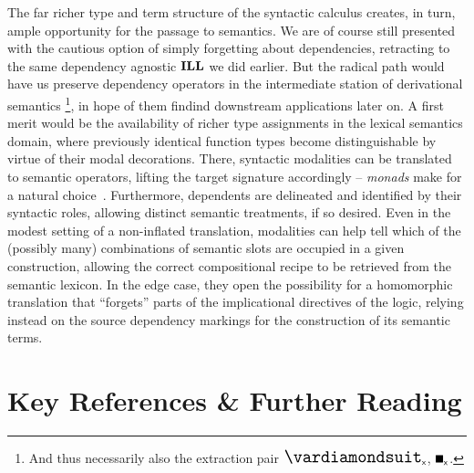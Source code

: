 The far richer type and term structure of the syntactic calculus creates, in turn, ample opportunity for the passage to semantics.
We are of course still presented with the cautious option of simply forgetting about dependencies, retracting to the same dependency agnostic $\textbf{ILL}$ we did earlier.
But the radical path would have us preserve dependency operators in the intermediate station of derivational semantics%
	\footnote{And thus necessarily also the extraction pair $\dxdia{x}$, $\dxbox{x}$.},
in hope of them findind downstream applications later on.
A first merit would be the availability of richer type assignments in the lexical semantics domain, where previously identical function types become distinguishable by virtue of their modal decorations.
There, syntactic modalities can be translated to semantic operators, lifting the target signature accordingly -- \textit{monads} make for a natural choice~\cite{kobayashi1997monad}.
Furthermore, dependents are delineated and identified by their syntactic roles, allowing distinct semantic treatments, if so desired.
Even in the modest setting of a non-inflated translation, modalities can help tell which of the (possibly many) combinations of semantic slots are occupied in a given construction, allowing the correct compositional recipe to be retrieved from the semantic lexicon.
In the edge case, they open the possibility for a homomorphic translation that ``forgets'' parts of the implicational directives of the logic, relying instead on the source dependency markings for the construction of its semantic terms.


\section{Key References \& Further Reading}
\todo



